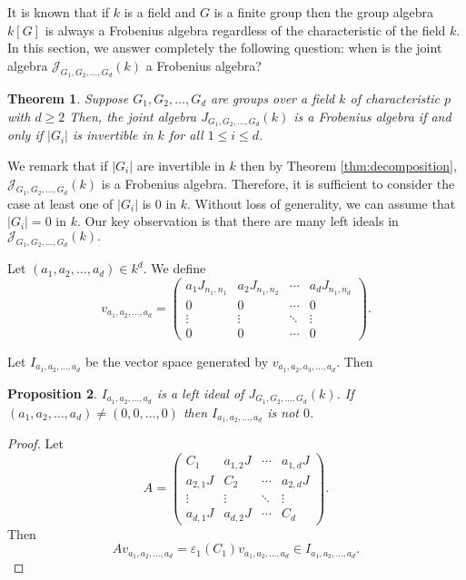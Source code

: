 \documentclass[12pt, a4paper]{amsart}
\numberwithin{equation}{section} %
\theoremstyle{plain}
\newtheorem{thm}{Theorem}[section]
\theoremstyle{definition}
\theoremstyle{plain}
\newtheorem{prop}[thm]{Proposition}
\theoremstyle{remark}
\newcommand{\ones}{J}
\newcommand{\sJ}{\mathcal{J}}
\begin{document}
It is known that if $k$ is a field and $G$ is a finite group then the group algebra $k[G]$ is always a Frobenius algebra regardless of the characteristic of the field $k$. In this section, we answer completely the following question: when is the joint algebra $\sJ_{G_1, G_2, \ldots, G_d}(k)$ a Frobenius algebra? 
\begin{thm} \label{thm:frob}
Suppose $G_1, G_2, \ldots, G_d$ are groups over a field $k$ of characteristic $p$ with $d \geq 2$ Then, the joint algebra $J_{G_1, G_2, \ldots, G_d}(k)$ is a Frobenius algebra if and only if $|G_i|$ is invertible in $k$ for all $1 \leq i \leq d.$
\end{thm}
We remark that if $|G_i|$ are invertible in $k$ then by Theorem \ref{thm:decomposition}, $\sJ_{G_1, G_2, \ldots, G_d}(k)$ is a Frobenius algebra. Therefore, it is sufficient to consider the case at least one of  $|G_i|$ is $0$ in $k$. Without loss of generality, we can assume that $|G_i|=0$ in $k.$ Our key observation is that there are many left ideals in $\sJ_{G_1, G_2, \ldots, G_d}(k).$


Let $(a_1,a_2, \ldots, a_d) \in k^d$. We define
\[ v_{a_1, a_2, \ldots, a_d}= 
\left(\begin{array}{c|c|c|c}
a_1 J_{n_1, n_1} & a_{2} J_{n_1, n_2} & \cdots & a_{d}J_{n_1, n_d} \\
\hline
0  & 0 & \cdots & 0 \\
\hline
\vdots & \vdots & \ddots & \vdots \\
\hline
0 & 0  & \cdots &0 
\end{array}\right) .\] 
 
Let $I_{a_1,a_2, \ldots, a_d}$ be the vector space generated by $v_{a_1,a_2, a_3, \ldots, a_d}$. Then 
\begin{prop} \label{prop:7.3}
$I_{a_1,a_2, \ldots, a_d}$ is a left ideal of $J_{G_1, G_2, \ldots, G_d}(k)$. If $(a_1,a_2, \ldots, a_d) \neq (0,0, \ldots, 0)$ then $I_{a_1,a_2, \ldots, a_d}$ is not $0$.
\end{prop}
\begin{proof}
Let 
\[ A=\left(\begin{array}{c|c|c|c}
C_1 & a_{1,2}\ones & \cdots & a_{1,d}\ones \\
\hline
a_{2,1}\ones & C_2 & \cdots & a_{2,d}\ones \\
\hline
\vdots & \vdots & \ddots & \vdots \\
\hline
a_{d,1}\ones & a_{d,2}\ones & \cdots & C_d
\end{array}\right) .\] 
Then 
\[ A v_{a_1, a_2, \ldots, a_d} = \varepsilon_1(C_1) v_{a_1, a_2, \ldots, a_d} \in I_{a_1, a_2, \ldots, a_d}.\] 
\end{proof}
\end{document}
